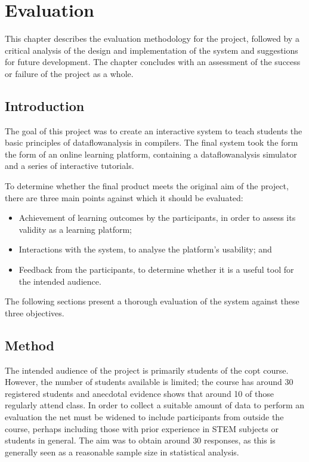 \documentclass[bsc,twoside,singlespacing,parskip,logo,notimes,normalheadings]{infthesis}
\begin{document}
\chapter{Evaluation}
This chapter describes the evaluation methodology for the project,
followed by a critical analysis of the design and implementation of
the system and suggestions for future development. The chapter
concludes with an assessment of the success or failure of the project
as a whole.

    \section{Introduction}

    The goal of this project was to create an interactive system to
    teach students the basic principles of \gls{dataflowanalysis} in
    compilers. The final system took the form the form of an online
    learning platform, containing a \gls{dataflowanalysis} simulator
    and a series of interactive tutorials.

    To determine whether the final product meets the original aim of
    the project, there are three main points against which it should
    be evaluated:

    \begin{itemize}
    \item Achievement of learning outcomes by the participants, in
      order to assess its validity as a learning platform;
    \item Interactions with the system, to analyse the platform's
      usability; and
    \item Feedback from the participants, to determine whether it is a
      useful tool for the intended audience.
    \end{itemize}

    The following sections present a thorough evaluation of the
    system against these three objectives.

    \section{Method}

    The intended audience of the project is primarily students of the
    \gls{copt} course. However, the number of students available is
    limited; the course has around 30 registered students and
    anecdotal evidence shows that around 10 of those regularly attend
    class. In order to collect a suitable amount of data to perform an
    evaluation the net must be widened to include participants from
    outside the course, perhaps including those with prior experience
    in STEM subjects or students in general. The aim was to obtain
    around 30 responses, as this is generally seen as a reasonable
    sample size in statistical analysis.
\end{document}
